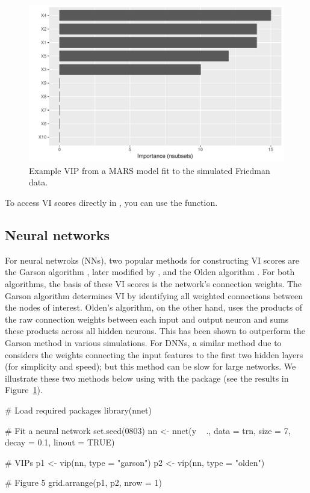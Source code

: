 \begin{figure}[!htb]
  \centering 
  \includegraphics[width=1\linewidth]{figures/vip-earth} 
  \caption{Example VIP from a MARS model fit to the simulated Friedman data.}
  \label{fig:vip-earth}
\end{figure}

To access VI scores directly in , you can use the  function.

\subsection{Neural networks}

For neural netwroks (NNs), two popular methods for constructing VI scores are the Garson algorithm \citep{interpreting-garson-1991}, later modified by \citet{back-goh-1995}, and the Olden algorithm \citep{accurate-olden-2004}. For both algorithms, the basis of these VI scores is the network’s connection weights. The Garson algorithm determines VI by identifying all weighted connections between the nodes of interest. Olden’s algorithm, on the other hand, uses the products of the raw connection weights between each input and output neuron and sums these products across all hidden neurons. This has been shown to outperform the Garson method in various simulations. For DNNs, a similar method due to \citet{data-gedeon-1997} considers the weights connecting the input features to the first two hidden layers (for simplicity and speed); but this method can be slow for large networks. We illustrate these two methods below using  with the  package \citep{nnet-pkg} (see the results in Figure~\ref{fig:vip-earth}).

\begin{example}
# Load required packages
library(nnet)

# Fit a neural network
set.seed(0803)
nn <- nnet(y ~ ., data = trn, size = 7, decay = 0.1, linout = TRUE)

# VIPs
p1 <- vip(nn, type = "garson")
p2 <- vip(nn, type = "olden")

# Figure 5
grid.arrange(p1, p2, nrow = 1)
\end{example}

